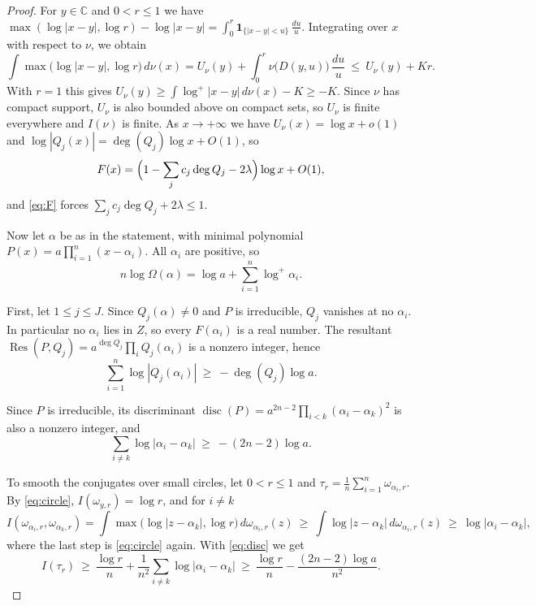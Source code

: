 \documentclass[11pt]{amsart}
\theoremstyle{remark}
\numberwithin{equation}{section}
\newcommand{\C}{\mathbb{C}}
\newcommand{\logp}{\log^{+}}
\newcommand{\Res}{\operatorname{Res}}
\newcommand{\disc}{\operatorname{disc}}
\begin{document}
\begin{proof}
For $y\in\C$ and $0<r\le1$ we have $\max(\log|x-y|,\log r)-\log|x-y|=\int_0^r\mathbf 1_{\{|x-y|<u\}}\,\frac{du}u$. Integrating over $x$ with respect to $\nu$, we obtain
\begin{equation}\label{eq:layer}
\int\max\bigl(\log|x-y|,\log r\bigr)\,d\nu(x)=U_\nu(y)+\int_0^r\nu\bigl(D(y,u)\bigr)\,\frac{du}u\ \le\ U_\nu(y)+Kr.
\end{equation}
With $r=1$ this gives $U_\nu(y)\ge\int\logp|x-y|\,d\nu(x)-K\ge-K$. Since $\nu$ has compact support, $U_\nu$ is also bounded above on compact sets, so $U_\nu$ is finite everywhere and $I(\nu)$ is finite. As $x\to+\infty$ we have $U_\nu(x)=\log x+o(1)$ and $\log|Q_j(x)|=\deg(Q_j)\log x+O(1)$, so
\[
F(x)=\Bigl(1-\sum_jc_j\deg Q_j-2\lambda\Bigr)\log x+O(1),
\]
and \eqref{eq:F} forces $\sum_jc_j\deg Q_j+2\lambda\le1$.

Now let $\alpha$ be as in the statement, with minimal polynomial $P(x)=a\prod_{i=1}^n(x-\alpha_i)$. All $\alpha_i$ are positive, so
\begin{equation}\label{eq:height}
n\log\Omega(\alpha)=\log a+\sum_{i=1}^n\logp\alpha_i.
\end{equation}

First, let $1\le j\le J$. Since $Q_j(\alpha)\ne0$ and $P$ is irreducible, $Q_j$ vanishes at no $\alpha_i$. In particular no $\alpha_i$ lies in $Z$, so every $F(\alpha_i)$ is a real number. The resultant $\Res(P,Q_j)=a^{\deg Q_j}\prod_iQ_j(\alpha_i)$ is a nonzero integer, hence
\begin{equation}\label{eq:res}
\sum_{i=1}^n\log|Q_j(\alpha_i)|\ \ge\ -\deg(Q_j)\log a.
\end{equation}

Since $P$ is irreducible, its discriminant $\disc(P)=a^{2n-2}\prod_{i<k}(\alpha_i-\alpha_k)^2$ is also a nonzero integer, and
\begin{equation}\label{eq:disc}
\sum_{i\ne k}\log|\alpha_i-\alpha_k|\ \ge\ -(2n-2)\log a.
\end{equation}

To smooth the conjugates over small circles, let $0<r\le1$ and $\tau_r=\frac1n\sum_{i=1}^n\omega_{\alpha_i,r}$. By \eqref{eq:circle}, $I(\omega_{y,r})=\log r$, and for $i\ne k$
\[
I(\omega_{\alpha_i,r},\omega_{\alpha_k,r})=\int\max\bigl(\log|z-\alpha_k|,\log r\bigr)\,d\omega_{\alpha_i,r}(z)\ \ge\ \int\log|z-\alpha_k|\,d\omega_{\alpha_i,r}(z)\ \ge\ \log|\alpha_i-\alpha_k|,
\]
where the last step is \eqref{eq:circle} again. With \eqref{eq:disc} we get
\begin{equation}\label{eq:Itau}
I(\tau_r)\ \ge\ \frac{\log r}n+\frac1{n^2}\sum_{i\ne k}\log|\alpha_i-\alpha_k|\ \ge\ \frac{\log r}n-\frac{(2n-2)\log a}{n^2}.
\end{equation}


\end{proof}
\end{document}
